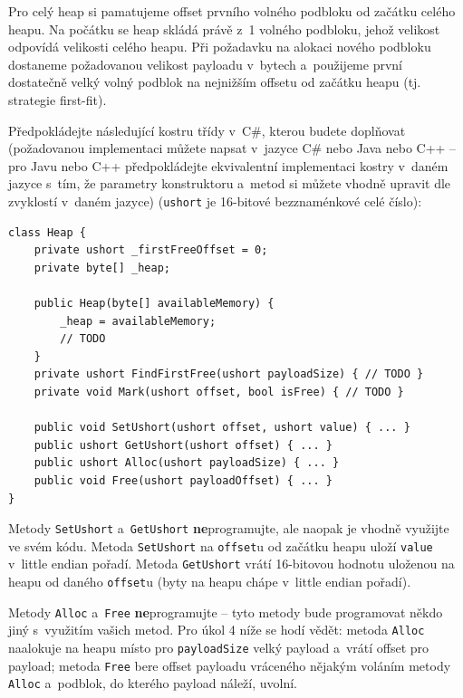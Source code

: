 \medskip
Pro celý heap si pamatujeme offset prvního volného podbloku od začátku celého heapu. Na
počátku se heap skládá právě z~1 volného podbloku, jehož velikost odpovídá velikosti
celého heapu. Při požadavku na alokaci nového podbloku dostaneme požadovanou velikost
payloadu v~bytech a~použijeme první dostatečně velký volný podblok na nejnižším offsetu od
začátku heapu (tj. strategie first-fit).

Předpokládejte následující kostru třídy v~C\#, kterou budete doplňovat (požadovanou
implementaci můžete napsat v~jazyce C\# nebo Java nebo C++ -- pro Javu nebo C++
předpokládejte ekvivalentní implementaci kostry v~daném jazyce s~tím, že parametry
konstruktoru a~metod si můžete vhodně upravit dle zvyklostí v~daném jazyce) (\texttt{ushort}
je 16-bitové bezznaménkové celé číslo):

\begin{lstlisting}[language={[Sharp]C}]
class Heap {
    private ushort _firstFreeOffset = 0;
    private byte[] _heap;

    public Heap(byte[] availableMemory) {
        _heap = availableMemory;
        // TODO
    }
    private ushort FindFirstFree(ushort payloadSize) { // TODO }
    private void Mark(ushort offset, bool isFree) { // TODO }

    public void SetUshort(ushort offset, ushort value) { ... }
    public ushort GetUshort(ushort offset) { ... }
    public ushort Alloc(ushort payloadSize) { ... }
    public void Free(ushort payloadOffset) { ... }
}
\end{lstlisting}

Metody \texttt{SetUshort} a~\texttt{GetUshort} \textbf{ne}programujte, ale naopak je
vhodně využijte ve svém kódu. Metoda \texttt{SetUshort} na \texttt{offset}u od začátku
heapu uloží \texttt{value} v~little endian pořadí. Metoda \texttt{GetUshort} vrátí
16-bitovou hodnotu uloženou na heapu od daného \texttt{offset}u (byty na heapu chápe
v~little endian pořadí).

Metody \texttt{Alloc} a~\texttt{Free} \textbf{ne}programujte -- tyto metody bude programovat
někdo jiný s~využitím vašich metod. Pro úkol 4 níže se hodí vědět: metoda \texttt{Alloc}
naalokuje na heapu místo pro \texttt{payloadSize} velký payload a~vrátí offset pro payload;
metoda \texttt{Free} bere offset payloadu vráceného nějakým voláním metody \texttt{Alloc}
a~podblok, do kterého payload náleží, uvolní.

